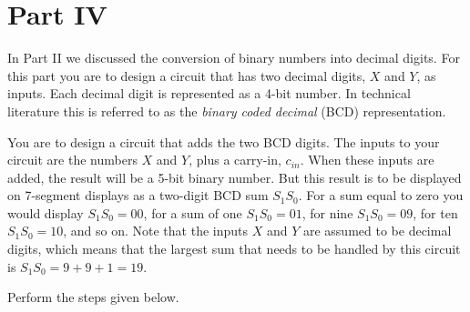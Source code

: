 \documentclass[epsfig,10pt,fullpage]{article}
\begin{document}
\section*{Part IV}
In Part II we discussed the conversion of binary numbers into decimal digits. For this
part you are to design a circuit that has two decimal digits, $X$ and $Y$, as inputs.
Each decimal digit is represented as a 4-bit number. In technical literature this is 
referred to as the {\it binary coded decimal} (BCD) representation. 

You are to design a circuit that adds the two BCD digits. The inputs to your circuit
are the numbers $X$ and $Y$, plus a carry-in, $c_{in}$. When these inputs are
added, the result will be a 5-bit binary number. But this result is to be displayed
on 7-segment displays as a two-digit BCD sum $S_1 S_0$. For a sum equal to zero you
would display $S_1 S_0 = 00$, for a sum of one $S_1 S_0 = 01$, for nine 
$S_1 S_0 = 09$, for ten $S_1 S_0 = 10$, and so on. Note that the inputs 
$X$ and $Y$ are assumed to be decimal
digits, which means that the largest sum that needs to be handled by this 
circuit is $S_1 S_0 = 9 + 9 + 1 = 19$. 

Perform the steps given below.
\end{document}
